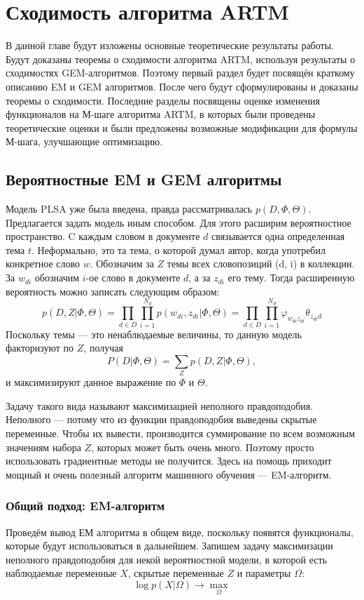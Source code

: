 \documentclass[12pt]{article}
\renewcommand{\phi}{\varphi}
\begin{document}
	\section{Сходимость алгоритма ARTM}
	В данной главе будут изложены основные теоретические результаты работы. Будут доказаны теоремы о сходимости алгоритма ARTM, используя результаты о сходимостях GEM-алгоритмов. Поэтому первый раздел будет посвящён краткому описанию EM и GEM алгоритмов. После чего будут сформулированы и доказаны теоремы о сходимости. Последние разделы посвящены оценке изменения функционалов на М-шаге алгоритма ARTM, в которых были проведены теоретические оценки и были предложены возможные модификации для формулы М-шага, улучшающие оптимизацию. 
	\subsection{Вероятностные EM и GEM алгоритмы}
Модель PLSA уже была введена, правда рассматривалась $p(D,\Phi,\Theta)$. Предлагается задать модель иным способом. Для этого расширим вероятностное пространство. C каждым словом в документе $d$ связывается одна определенная тема $t$. Неформально, это та тема, о которой думал автор, когда употребил конкретное слово $w$. Обозначим за $Z$ темы всех словопозиций (d, i) в коллекции. За $w_{di}$ обозначим $i$-ое слово в документе $d$, а за $z_{di}$ его тему. Тогда расширенную вероятность можно записать следующим образом:
\[
p(D, Z|\Phi, \Theta) = \prod\limits_{d \in D} \prod\limits_{i=1}^{N_d} p(w_{di}, z_{di}|\Phi, \Theta) = \prod\limits_{d \in D} \prod\limits_{i=1}^{N_d} \phi_{w_{di}z_{di}}\theta_{z_{di}d}
\]
Поскольку темы --- это ненаблюдаемые величины, то данную модель факторизуют по $Z$, получая
\[
P(D|\Phi,\Theta ) = \sum\limits_Z p(D, Z|\Phi, \Theta),
\]
и максимизируют данное выражение по $\Phi$ и $\Theta$.

Задачу такого вида называют максимизацией неполного правдоподобия. Неполного ---  потому что из функции правдоподобия выведены скрытые переменные. Чтобы их вывести, производится суммирование по всем возможным значениям набора $Z$, которых может быть очень много. Поэтому просто использовать градиентные методы не получится. Здесь на помощь приходит мощный и очень полезный алгоритм машинного обучения --- EM-алгоритм.
	\subsubsection{Общий подход: EM-алгоритм}
	Проведём вывод ЕМ алгоритма в общем виде, поскольку появятся функционалы, которые будут использоваться в дальнейшем. Запишем задачу максимизации неполного правдоподобия для некой вероятностной модели, в которой есть наблюдаемые переменные $X$, скрытые переменные $Z$ и параметры $\Omega$:
\[
\log p(X|\Omega) \to \max\limits_{\Omega}
\]
\end{document}
